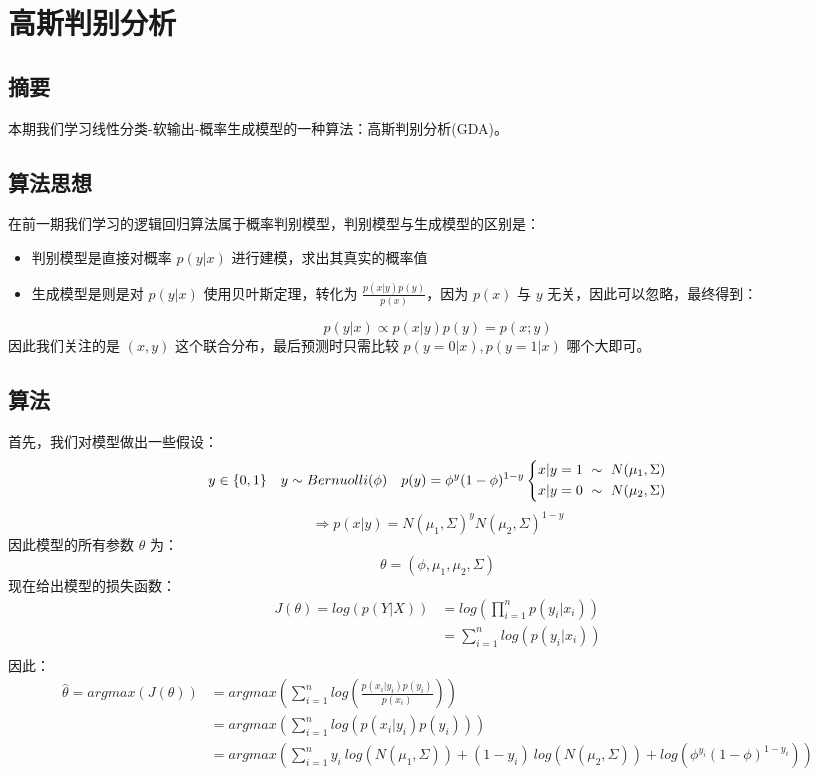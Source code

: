 \documentclass{report}
\begin{document}
\chapter{高斯判别分析}
\section{摘要}
本期我们学习线性分类-软输出-概率生成模型的一种算法：高斯判别分析(GDA)。
\section{算法思想}
在前一期我们学习的逻辑回归算法属于概率判别模型，判别模型与生成模型的区别是：
\begin{itemize}
	\item 判别模型是直接对概率 $p(y|x)$ 进行建模，求出其真实的概率值
	\item 生成模型是则是对 $p(y|x)$ 使用贝叶斯定理，转化为 $\frac{p(x|y)p(y)}{p(x)}$，因为 $p(x)$ 与 $y$ 无关，因此可以忽略，最终得到：
\end{itemize}
$$
p(y|x)\propto p(x|y)p(y)=p(x;y)
$$
因此我们关注的是 $(x,y)$ 这个联合分布，最后预测时只需比较 $p(y=0|x),p(y=1|x)$ 哪个大即可。
\section{算法}
首先，我们对模型做出一些假设：
$$
y\in \{0,1\}\quad y\sim Bernuolli(\phi)\quad p(y)=\phi^y(1-\phi)^{1-y}\\\left \{\begin{aligned}x|y=1 \ \sim \ N(\mu_1,\Sigma)\\x|y=0 \ \sim \ N(\mu_2,\Sigma)\end{aligned}\right.
$$
$$
\Longrightarrow p(x|y)=N(\mu_1,\Sigma)^yN(\mu_2,\Sigma)^{1-y}
$$
因此模型的所有参数 $\theta$ 为：
$$
\theta=(\phi, \mu_1, \mu_2, \Sigma)
$$
现在给出模型的损失函数：
$$
\begin{aligned}
J(\theta)=log(p(Y|X))&=log(\prod_{i=1}^n p(y_i|x_i))\\
&=\sum_{i=1}^n log(p(y_i|x_i))\\
\end{aligned}
$$
因此：
$$
\begin{aligned}
\hat{\theta}=argmax(J(\theta))&=argmax(\sum_{i=1}^nlog(\frac{p(x_i|y_i)p(y_i)}{p(x_i)}))\\
&=argmax(\sum_{i=1}^n log(p(x_i|y_i)p(y_i)))\\
&=argmax(\sum_{i=1}^n y_i\ log(N(\mu_1,\Sigma))+(1-y_i)\ log(N(\mu_2,\Sigma))+log(\phi^{y_i} (1-\phi)^{1-y_i}))
\end{aligned}
$$
\end{document}

